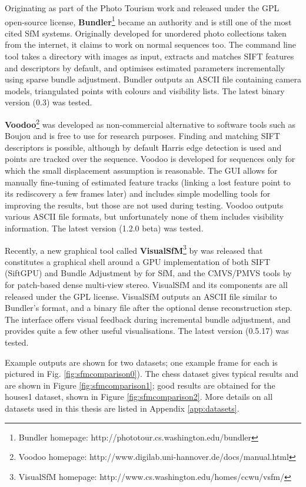 Originating as part of the Photo Tourism work \cite{Snavely2006} and released under the GPL open-source license, \textbf{Bundler}\footnote{Bundler homepage: http://phototour.cs.washington.edu/bundler} became an authority and is still one of the most cited SfM systems. Originally developed for unordered photo collections taken from the internet, it claims to work on normal sequences too. The command line tool takes a directory with images as input, extracts and matches SIFT features and descriptors by default, and optimises estimated parameters incrementally using sparse bundle adjustment. Bundler outputs an ASCII file containing camera models, triangulated points with colours and visibility lists. The latest binary version (0.3) was tested.

\textbf{Voodoo}\footnote{Voodoo homepage: http://www.digilab.uni-hannover.de/docs/manual.html} was developed as non-commercial alternative to software tools such as Boujou and is free to use for research purposes. Finding and matching SIFT descriptors is possible, although by default Harris edge detection is used and points are tracked over the sequence. Voodoo is developed for sequences only for which the small displacement assumption is reasonable. The GUI allows for manually fine-tuning of estimated feature tracks (\eg linking a lost feature point to its rediscovery a few frames later) and includes simple modelling tools for improving the results, but those are not used during testing. Voodoo outputs various ASCII file formats, but unfortunately none of them includes visibility information. The latest version (1.2.0 beta) was tested.

Recently, a new graphical tool called \textbf{VisualSfM}\footnote{VisualSfM homepage: http://www.cs.washington.edu/homes/ccwu/vsfm/} by  was released that constitutes a graphical shell around a GPU implementation of both SIFT (SiftGPU) and Bundle Adjustment by  for SfM, and the CMVS/PMVS tools by  for patch-based dense multi-view stereo. VisualSfM and its components are all released under the GPL license. VisualSfM outputs an ASCII file similar to Bundler's format, and a binary file after the optional dense reconstruction step. The interface offers visual feedback during incremental bundle adjustment, and provides quite a few other useful visualisations. The latest version (0.5.17) was tested.

Example outputs are shown for two datasets; one example frame for each is pictured in Fig. \ref{fig:sfmcomparison0}). The chess dataset gives typical results and are shown in Figure \ref{fig:sfmcomparison1}; good results are obtained for the houses1 dataset, shown in Figure \ref{fig:sfmcomparison2}. More details on all datasets used in this thesis are listed in Appendix \ref{app:datasets}.

